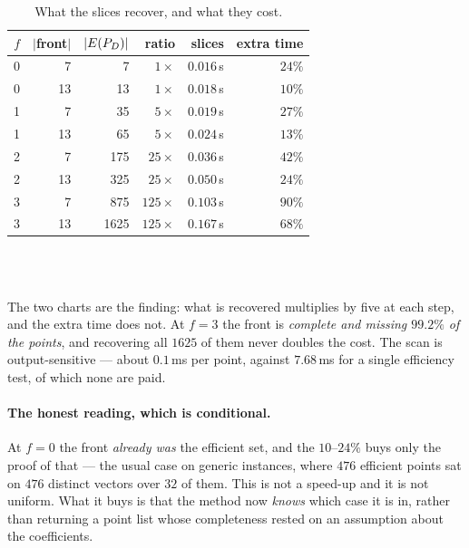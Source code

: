 \documentclass[11pt,a4paper]{article}
\begin{document}
\begin{table}[h]
\centering
\caption{What the slices recover, and what they cost.}
\begin{tabular}{rrrrrr}
\toprule
$f$ & $|$front$|$ & $|E(P_{D})|$ & ratio & slices & extra time \\
\midrule
0 &  7 &     7 & $1\times$   & $0.016$\,s & $24\%$ \\
0 & 13 &    13 & $1\times$   & $0.018$\,s & $10\%$ \\
1 &  7 &    35 & $5\times$   & $0.019$\,s & $27\%$ \\
1 & 13 &    65 & $5\times$   & $0.024$\,s & $13\%$ \\
2 &  7 &   175 & $25\times$  & $0.036$\,s & $42\%$ \\
2 & 13 &   325 & $25\times$  & $0.050$\,s & $24\%$ \\
3 &  7 &   875 & $125\times$ & $0.103$\,s & $90\%$ \\
3 & 13 &  1625 & $125\times$ & $0.167$\,s & $68\%$ \\
\bottomrule
\end{tabular}
\end{table}

\begin{center}
\\[6pt]
\\[2pt]
\end{center}

\noindent
The two charts are the finding: what is recovered multiplies by five at each
step, and the extra time does not.  At $f = 3$ the front is \emph{complete and
missing $99.2\%$ of the points}, and recovering all $1625$ of them never
doubles the cost.  The scan is output-sensitive --- about $0.1$\,ms per point,
against $7.68$\,ms for a single efficiency test, of which none are paid.

\paragraph{The honest reading, which is conditional.}  At $f = 0$ the front
\emph{already was} the efficient set, and the $10$--$24\%$ buys only the proof
of that --- the usual case on generic instances, where $476$ efficient points
sat on $476$ distinct vectors over $32$ of them.  This is not a speed-up and it
is not uniform.  What it buys is that the method now \emph{knows} which case it
is in, rather than returning a point list whose completeness rested on an
assumption about the coefficients.
\end{document}
